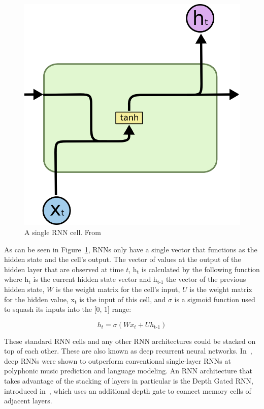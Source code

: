 \begin{figure}
	\begin{center}
		\includegraphics[scale=0.5]{rnn/rnn_cell}
	\end{center}
	\caption{A single RNN cell. From~\cite{olah2015understanding}\label{fig:rnn_cell}}
\end{figure}

As can be seen in Figure~\ref{fig:rnn_cell}, RNNs only have a single vector that functions as the hidden state and the cell's output. The vector of values at the output of the hidden layer that are observed at time \(t\), h\(_{\text{t}}\) is calculated by the following function where h\(_{\text{t}}\) is the current hidden state vector and h\(_{\text{t-1}}\) the vector of the previous hidden state, \(W\) is the weight matrix for the cell's input, \(U\) is the weight matrix for the hidden value, x\(_{\text{t}}\) is the input of this cell, and \(\sigma \) is a sigmoid function used to squash its inputs into the [0, 1] range:

\begin{equation} \label{eq:hidden_gate_lstm}
h_t = \sigma(Wx_t + Uh_\text{t-1})
\end{equation}

These standard RNN cells and any other RNN architectures could be stacked on top of each other. These are also known as deep recurrent neural networks. In~\cite{pascanu2013construct}, deep RNNs were shown to outperform conventional single-layer RNNs at polyphonic music prediction and language modeling. An RNN architecture that takes advantage of the stacking of layers in particular is the Depth Gated RNN, introduced in~\cite{yao2015depth}, which uses an additional depth gate to connect memory cells of adjacent layers.

